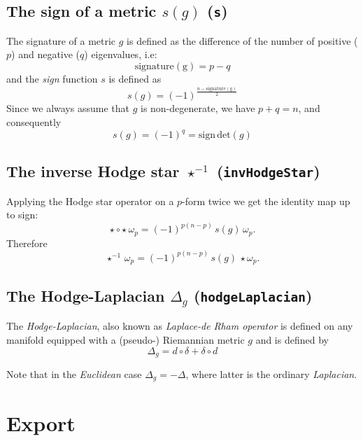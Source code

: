 \documentclass[12pt,a4paper]{article}
\begin{document}
\subsection{The sign of a metric  $s(g)$ ({\tt s})}
The signature of a metric $g$ is defined as the difference of
the number of positive ($p$) and negative ($q$) eigenvalues, i.e:
\begin{displaymath}
	\mathrm{signature(g)} = p - q
\end{displaymath}
and the {\it sign} function $s$ is defined as
\begin{displaymath}
	s(g) = (-1)^{\frac{n -\mathrm{signature(g)}}{2}} 
\end{displaymath}
Since we always assume that $g$ is non-degenerate, we have 
$p+q=n$, and consequently
\begin{displaymath}
	s(g) = (-1)^{q} = \mathrm{sign}\, \mathrm{det}(g)
\end{displaymath}
%

\subsection{The inverse Hodge star $\star^{-1}$ ({\tt invHodgeStar})}
Applying the Hodge star operator on a $p$-form twice we get
the identity map up to sign:
\begin{displaymath}
	\star\circ\star\, \omega_p = (-1)^{p(n-p)}\,s(g)\,\omega_p.
\end{displaymath}
Therefore
\begin{displaymath}
	\star^{-1}\,\omega_p = (-1)^{p(n-p)}\,s(g)\,\star\omega_p. 
\end{displaymath}
%

\subsection{The Hodge-Laplacian $\Delta_g$ ({\tt hodgeLaplacian})}
The {\it Hodge-Laplacian}, also known as {\it Laplace-de Rham operator} 
is defined on any manifold equipped with a (pseudo-) Riemannian
metric $g$ and is defined by
\begin{displaymath}
	\Delta_g = d\circ\delta + \delta\circ d
\end{displaymath}

Note that in the {\it Euclidean} case $\Delta_g = - \Delta$, where
latter is the ordinary {\it Laplacian}.
%
%
%
\section{Export}
%
\end{document}
